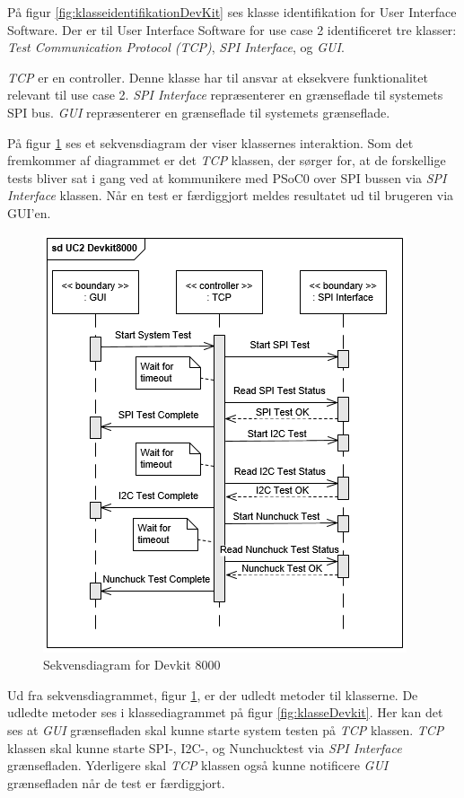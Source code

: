 På figur \ref{fig:klasseidentifikationDevKit} ses klasse identifikation for User Interface Software. Der er til User Interface Software for use case 2 identificeret tre klasser: \textit{Test Communication Protocol (TCP)}, \textit{SPI Interface}, og \textit{GUI}.

\textit{TCP} er en controller. Denne klasse har til ansvar at eksekvere funktionalitet relevant til use case 2. \textit{SPI Interface} repræsenterer en grænseflade til systemets SPI bus. \textit{GUI} repræsenterer en grænseflade til systemets grænseflade.

På figur \ref{fig:sekvensDevkit} ses et sekvensdiagram der viser klassernes interaktion. Som det fremkommer af diagrammet er det \textit{TCP} klassen, der sørger for, at de forskellige tests bliver sat i gang ved at kommunikere med PSoC0 over SPI bussen via \textit{SPI Interface} klassen. Når en test er færdiggjort meldes resultatet ud til brugeren via GUI'en.

\begin{figure}[H]
	\centering
	\includegraphics[]{Systemarkitektur/images/DevKit8000SequenceDiagram.png}
	\caption{Sekvensdiagram for Devkit 8000}
	\label{fig:sekvensDevkit}
\end{figure}

Ud fra sekvensdiagrammet, figur \ref{fig:sekvensDevkit}, er der udledt metoder til klasserne. De udledte metoder ses i klassediagrammet på figur \ref{fig:klasseDevkit}. Her kan det ses at \textit{GUI} grænsefladen skal kunne starte system testen på \textit{TCP} klassen. \textit{TCP} klassen skal kunne starte SPI-, I2C-, og Nunchucktest via \textit{SPI Interface} grænsefladen. Yderligere skal \textit{TCP} klassen også kunne notificere \textit{GUI} grænsefladen når de test er færdiggjort.


